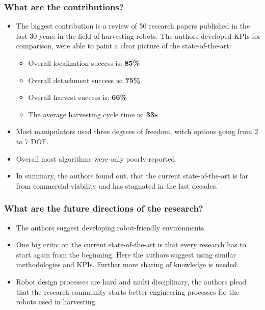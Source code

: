     \subsubsection*{What are the contributions?}
    \begin{itemize}
        \item The biggest contribution is a review of 50 research papers published in the last 30 years in the field of harvesting robots. The authors developed KPIs for comparison, were able to paint a clear picture of the state-of-the-art: \ \begin{itemize}
            \item Overall localization success is: \textbf{85\%}
            \item Overall detachment success is: \textbf{75\%}
            \item Overall harvest success is: \textbf{66\%}
            \item The average harvesting cycle time is: \textbf{33s}
        \end{itemize}
        \item Most manipulators used three degrees of freedom, witch options going from 2 to 7 DOF.
        \item Overall most algorithms were only poorly reported.
        \item In summary, the authors found out, that the current state-of-the-art is far from commercial viability and has stagnated in the last decades. 
    \end{itemize}
    \subsubsection*{What are the future directions of the research?}
    \begin{itemize}
        \item The authors suggest developing robot-friendly environments.
        \item One big critic on the current state-of-the-art is that every research has to start again from the beginning. Here the authors suggest using similar methodologies and KPIs. Further more sharing of knowledge is needed.
        \item Robot design processes are hard and multi disciplinary, the authors plead that the research community starts better engineering processes for the robots used in harvesting. 
    \end{itemize}
